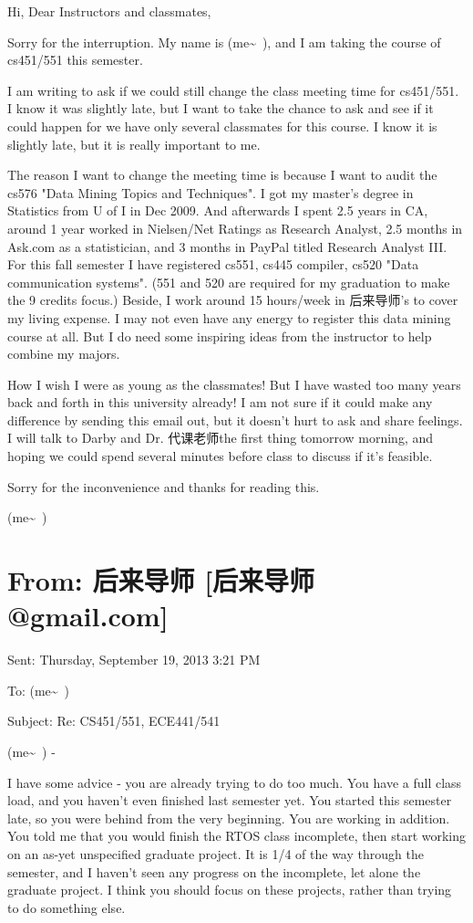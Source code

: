 \documentclass[12pt]{book}
\begin{document}
Hi, Dear Instructors and classmates, 

Sorry for the interruption. My name is (me\textasciitilde{}~), and I am taking the course of cs451/551 this semester. 

I am writing to ask if we could still change the class meeting time for cs451/551. I know it was slightly late, but I want to take the chance to ask and see if it could happen for we have only several classmates for this course. I know it is slightly late, but it is really important to me. 

The reason I want to change the meeting time is because I want to audit the cs576 "Data Mining Topics and Techniques". I got my master's degree in Statistics from U of I in Dec 2009. And afterwards I spent 2.5 years in CA, around 1 year worked in Nielsen/Net Ratings as Research Analyst, 2.5 months in Ask.com as a statistician, and 3 months in PayPal titled Research Analyst III. For this fall semester I have registered cs551, cs445 compiler, cs520 "Data communication systems". (551 and 520 are required for my graduation to make the 9 credits focus.) Beside, I work around 15 hours/week in 后来导师's to cover my living expense. I may not even have any energy to register this data mining course at all. But I do need some inspiring ideas from the instructor to help combine my majors. 

How I wish I were as young as the classmates! But I have wasted too many years back and forth in this university already! I am not sure if it could make any difference by sending this email out, but it doesn't hurt to ask and share feelings. I will talk to Darby and Dr. 代课老师the first thing tomorrow morning, and hoping we could spend several minutes before class to discuss if it's feasible. 

Sorry for the inconvenience and thanks for reading this. 

(me\textasciitilde{}~)


\section{From: 后来导师 [后来导师@gmail.com]}
\label{sec-12-3}
Sent: Thursday, September 19, 2013 3:21 PM

To: (me\textasciitilde{}~)

Subject: Re: CS451/551, ECE441/541

(me\textasciitilde{}~) -

I have some advice - you are already trying to do too much. You have a full class load, and you haven't even finished last semester yet. You started this semester late, so you were behind from the very beginning. You are working in addition. You told me that you would finish the RTOS class incomplete, then start working on an as-yet unspecified graduate project. It is 1/4 of the way through the semester, and I haven't seen any progress on the incomplete, let alone the graduate project. I think you should focus on these projects, rather than trying to do something else.
\end{document}
